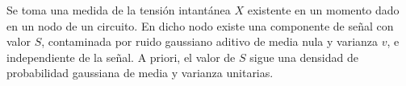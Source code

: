 \ifspanish

\question[25] %

Se toma una medida de la tensión intantánea $X$ existente en un momento dado en un nodo de un circuito. En dicho nodo existe una componente de señal con valor $S$, contaminada por ruido gaussiano aditivo de media nula y varianza $v$, e independiente de la señal. A priori, el valor de $S$ sigue una densidad de probabilidad gaussiana de media y varianza unitarias.


